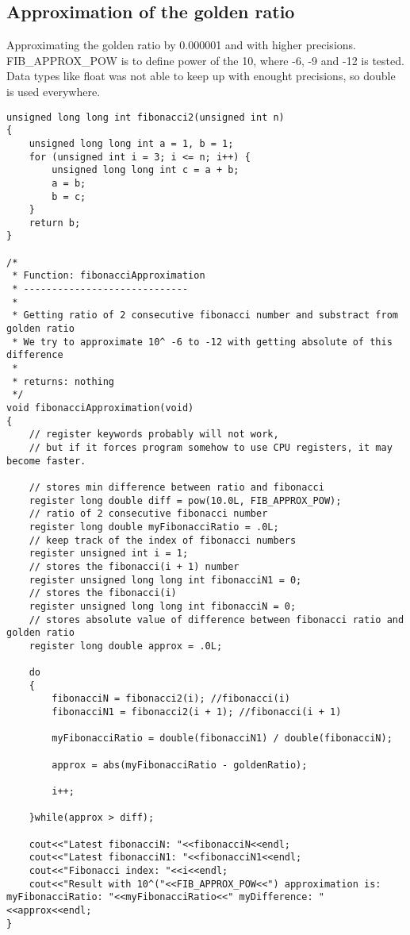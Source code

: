 \documentclass{article}
\begin{document}
	\subsection{Approximation of the golden ratio}
	Approximating the golden ratio by 0.000001 and with higher precisions. FIB\_APPROX\_POW is to define power of the 10, where -6, -9 and -12 is tested. Data types like float was not able to keep up with enought precisions, so double is used everywhere.
		\begin{lstlisting}[label=fibonacci-approximation,caption=Fibonacci Approximation]	
unsigned long long int fibonacci2(unsigned int n)
{
    unsigned long long int a = 1, b = 1;
    for (unsigned int i = 3; i <= n; i++) {
        unsigned long long int c = a + b;
        a = b;
        b = c;
    }
    return b;
}

/*
 * Function: fibonacciApproximation
 * -----------------------------
 *
 * Getting ratio of 2 consecutive fibonacci number and substract from golden ratio
 * We try to approximate 10^ -6 to -12 with getting absolute of this difference
 *
 * returns: nothing
 */
void fibonacciApproximation(void)
{
    // register keywords probably will not work,
    // but if it forces program somehow to use CPU registers, it may become faster.
    
    // stores min difference between ratio and fibonacci
    register long double diff = pow(10.0L, FIB_APPROX_POW);
    // ratio of 2 consecutive fibonacci number
    register long double myFibonacciRatio = .0L;
    // keep track of the index of fibonacci numbers
    register unsigned int i = 1;
    // stores the fibonacci(i + 1) number
    register unsigned long long int fibonacciN1 = 0;
    // stores the fibonacci(i)
    register unsigned long long int fibonacciN = 0;
    // stores absolute value of difference between fibonacci ratio and golden ratio
    register long double approx = .0L;
    
    do
    {
        fibonacciN = fibonacci2(i); //fibonacci(i)
        fibonacciN1 = fibonacci2(i + 1); //fibonacci(i + 1)
        
        myFibonacciRatio = double(fibonacciN1) / double(fibonacciN);
        
        approx = abs(myFibonacciRatio - goldenRatio);
        
        i++;
        
    }while(approx > diff);
    
    cout<<"Latest fibonacciN: "<<fibonacciN<<endl;
    cout<<"Latest fibonacciN1: "<<fibonacciN1<<endl;
    cout<<"Fibonacci index: "<<i<<endl;
    cout<<"Result with 10^("<<FIB_APPROX_POW<<") approximation is: myFibonacciRatio: "<<myFibonacciRatio<<" myDifference: "<<approx<<endl;
}
		\end{lstlisting}
\end{document}
